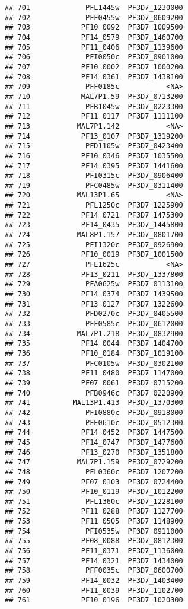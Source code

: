 \documentclass[12pt, a4paper]{article}\usepackage[]{graphicx}\usepackage[]{color}
\makeatletter
\newenvironment{kframe}{%
 \def\at@end@of@kframe{}%
 \ifinner\ifhmode%
  \def\at@end@of@kframe{\end{minipage}}%
  \begin{minipage}{\columnwidth}%
 \fi\fi%
 \def\FrameCommand##1{\hskip\@totalleftmargin \hskip-\fboxsep
 \colorbox{shadecolor}{##1}\hskip-\fboxsep
     \hskip-\linewidth \hskip-\@totalleftmargin \hskip\columnwidth}%
 \MakeFramed {\advance\hsize-\width
   \@totalleftmargin\z@ \linewidth\hsize
   \@setminipage}}%
 {\par\unskip\endMakeFramed%
 \at@end@of@kframe}
\newenvironment{knitrout}{}{} %
\makeatother
\begin{document}
\begin{knitrout}
\begin{kframe}
\begin{verbatim}
## 701             PFL1445w  PF3D7_1230000
## 702             PFF0455w  PF3D7_0609200
## 703            PF10_0092  PF3D7_1009500
## 704            PF14_0579  PF3D7_1460700
## 705            PF11_0406  PF3D7_1139600
## 706             PFI0050c  PF3D7_0901000
## 707            PF10_0002  PF3D7_1000200
## 708            PF14_0361  PF3D7_1438100
## 709             PFF0185c           <NA>
## 710            MAL7P1.59  PF3D7_0713200
## 711             PFB1045w  PF3D7_0223300
## 712            PF11_0117  PF3D7_1111100
## 713           MAL7P1.142           <NA>
## 714            PF13_0107  PF3D7_1319200
## 715             PFD1105w  PF3D7_0423400
## 716            PF10_0346  PF3D7_1035500
## 717            PF14_0395  PF3D7_1441600
## 718             PFI0315c  PF3D7_0906400
## 719             PFC0485w  PF3D7_0311400
## 720           MAL13P1.65           <NA>
## 721             PFL1250c  PF3D7_1225900
## 722            PF14_0721  PF3D7_1475300
## 723            PF14_0435  PF3D7_1445800
## 724           MAL8P1.157  PF3D7_0801700
## 725             PFI1320c  PF3D7_0926900
## 726            PF10_0019  PF3D7_1001500
## 727             PFE1625c           <NA>
## 728            PF13_0211  PF3D7_1337800
## 729             PFA0625w  PF3D7_0113100
## 730            PF14_0374  PF3D7_1439500
## 731            PF13_0127  PF3D7_1322600
## 732             PFD0270c  PF3D7_0405500
## 733             PFF0585c  PF3D7_0612000
## 734           MAL7P1.218  PF3D7_0832900
## 735            PF14_0044  PF3D7_1404700
## 736            PF10_0184  PF3D7_1019100
## 737             PFC0105w  PF3D7_0302100
## 738            PF11_0480  PF3D7_1147000
## 739            PF07_0061  PF3D7_0715200
## 740             PFB0946c  PF3D7_0220900
## 741          MAL13P1.413  PF3D7_1370300
## 742             PFI0880c  PF3D7_0918000
## 743             PFE0610c  PF3D7_0512300
## 744            PF14_0452  PF3D7_1447500
## 745            PF14_0747  PF3D7_1477600
## 746            PF13_0270  PF3D7_1351800
## 747           MAL7P1.159  PF3D7_0729200
## 748             PFL0360c  PF3D7_1207200
## 749            PF07_0103  PF3D7_0724400
## 750            PF10_0119  PF3D7_1012200
## 751             PFL1360c  PF3D7_1228100
## 752            PF11_0288  PF3D7_1127700
## 753            PF11_0505  PF3D7_1148900
## 754             PFI0535w  PF3D7_0911000
## 755            PF08_0088  PF3D7_0812300
## 756            PF11_0371  PF3D7_1136000
## 757            PF14_0321  PF3D7_1434000
## 758             PFF0035c  PF3D7_0600700
## 759            PF14_0032  PF3D7_1403400
## 760            PF11_0039  PF3D7_1102700
## 761            PF10_0196  PF3D7_1020300

\end{verbatim}
\end{kframe}
\end{knitrout}
\end{document}
